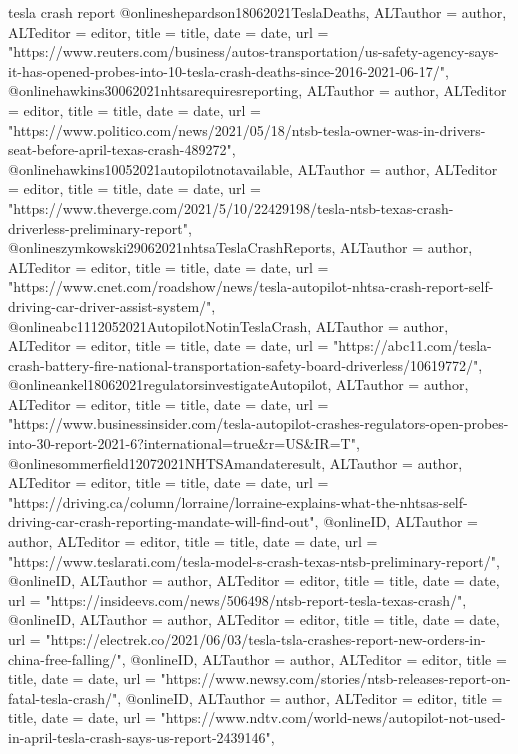 {{{tesla crash report
@online{shepardson18062021TeslaDeaths,	ALTauthor = {author},	ALTeditor = {editor},	title = {title},	date = {date},	url = {"https://www.reuters.com/business/autos-transportation/us-safety-agency-says-it-has-opened-probes-into-10-tesla-crash-deaths-since-2016-2021-06-17/"},}
@online{hawkins30062021nhtsarequiresreporting,	ALTauthor = {author},	ALTeditor = {editor},	title = {title},	date = {date},	url = {"https://www.politico.com/news/2021/05/18/ntsb-tesla-owner-was-in-drivers-seat-before-april-texas-crash-489272"},}
@online{hawkins10052021autopilotnotavailable,	ALTauthor = {author},	ALTeditor = {editor},	title = {title},	date = {date},	url = {"https://www.theverge.com/2021/5/10/22429198/tesla-ntsb-texas-crash-driverless-preliminary-report"},}
@online{szymkowski29062021nhtsaTeslaCrashReports,	ALTauthor = {author},	ALTeditor = {editor},	title = {title},	date = {date},	url = {"https://www.cnet.com/roadshow/news/tesla-autopilot-nhtsa-crash-report-self-driving-car-driver-assist-system/"},}
@online{abc1112052021AutopilotNotinTeslaCrash,	ALTauthor = {author},	ALTeditor = {editor},	title = {title},	date = {date},	url = {"https://abc11.com/tesla-crash-battery-fire-national-transportation-safety-board-driverless/10619772/"},}
@online{ankel18062021regulatorsinvestigateAutopilot,	ALTauthor = {author},	ALTeditor = {editor},	title = {title},	date = {date},	url = {"https://www.businessinsider.com/tesla-autopilot-crashes-regulators-open-probes-into-30-report-2021-6?international=true&r=US&IR=T"},}
@online{sommerfield12072021NHTSAmandateresult,	ALTauthor = {author},	ALTeditor = {editor},	title = {title},	date = {date},	url = {"https://driving.ca/column/lorraine/lorraine-explains-what-the-nhtsas-self-driving-car-crash-reporting-mandate-will-find-out"},}
@online{ID,	ALTauthor = {author},	ALTeditor = {editor},	title = {title},	date = {date},	url = {"https://www.teslarati.com/tesla-model-s-crash-texas-ntsb-preliminary-report/"},}
@online{ID,	ALTauthor = {author},	ALTeditor = {editor},	title = {title},	date = {date},	url = {"https://insideevs.com/news/506498/ntsb-report-tesla-texas-crash/"},}
@online{ID,	ALTauthor = {author},	ALTeditor = {editor},	title = {title},	date = {date},	url = {"https://electrek.co/2021/06/03/tesla-tsla-crashes-report-new-orders-in-china-free-falling/"},}
@online{ID,	ALTauthor = {author},	ALTeditor = {editor},	title = {title},	date = {date},	url = {"https://www.newsy.com/stories/ntsb-releases-report-on-fatal-tesla-crash/"},}
@online{ID,	ALTauthor = {author},	ALTeditor = {editor},	title = {title},	date = {date},	url = {"https://www.ndtv.com/world-news/autopilot-not-used-in-april-tesla-crash-says-us-report-2439146"},}
}}}
